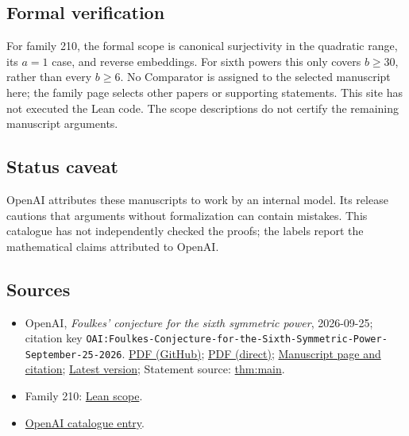 \documentclass[11pt]{article}
\begin{document}
\subsection{Formal verification}
For family 210, the formal scope is canonical surjectivity in the quadratic range, its $a=1$ case, and reverse embeddings. For sixth powers this only covers $b\geq30$, rather than every $b\geq6$. No Comparator is assigned to the selected manuscript here; the family page selects other papers or supporting statements. This site has not executed the Lean code. The scope descriptions do not certify the remaining manuscript arguments.

\subsection{Status caveat}
OpenAI attributes these manuscripts to work by an internal model. Its release cautions that arguments without formalization can contain mistakes. This catalogue has not independently checked the proofs; the labels report the mathematical claims attributed to OpenAI.

\subsection{Sources}
\begin{itemize}
\item OpenAI, \emph{Foulkes' conjecture for the sixth symmetric power}, 2026-09-25; citation key \texttt{OAI:Foulkes-Conjecture-for-the-Sixth-Symmetric-Power-September-25-2026}. \href{https://github.com/openai/math/blob/adc7f1241b42e322a6451854ab7e4b4c146bf78a/preprints/Foulkes-Conjecture-for-the-Sixth-Symmetric-Power-September-25-2026/main.pdf}{PDF (GitHub)}; \href{https://github.com/openai/math/raw/adc7f1241b42e322a6451854ab7e4b4c146bf78a/preprints/Foulkes-Conjecture-for-the-Sixth-Symmetric-Power-September-25-2026/main.pdf}{PDF (direct)}; \href{https://github.com/openai/math/blob/adc7f1241b42e322a6451854ab7e4b4c146bf78a/preprints/Foulkes-Conjecture-for-the-Sixth-Symmetric-Power-September-25-2026/README.md}{Manuscript page and citation}; \href{https://github.com/openai/math/blob/main/preprints/Foulkes-Conjecture-for-the-Sixth-Symmetric-Power-September-25-2026/main.pdf}{Latest version}; Statement source: \href{https://github.com/openai/math/blob/adc7f1241b42e322a6451854ab7e4b4c146bf78a/preprints/Foulkes-Conjecture-for-the-Sixth-Symmetric-Power-September-25-2026/build/sections/introduction.tex\#L19}{thm:main}.
\item Family 210: \href{https://github.com/openai/math/blob/adc7f1241b42e322a6451854ab7e4b4c146bf78a/lean/docs/210.md}{Lean scope}.
\item \href{https://github.com/openai/math/blob/adc7f1241b42e322a6451854ab7e4b4c146bf78a/CONTENTS.md}{OpenAI catalogue entry}.
\end{itemize}
\end{document}
